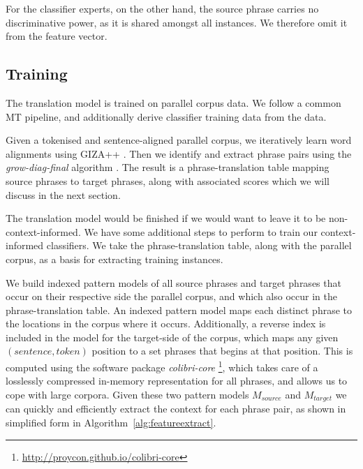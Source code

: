 \documentclass[smallextended]{svjour3}       %
\theoremstyle{break}
\begin{document}
For the classifier experts, on the other hand, the source
phrase carries no discriminative power, as it is shared amongst all instances. We
therefore omit it from the feature vector.

\subsection{Training}

The translation model is trained on parallel corpus data. We follow a common
MT pipeline, and additionally derive classifier training data from the data.

Given a tokenised and sentence-aligned parallel corpus, we iteratively learn
word alignments using GIZA++ \citep{GIZA}. Then we identify and extract phrase
pairs using the {\em grow-diag-final}\/ algorithm \citep{OchNey2003}. The
result is a phrase-translation table mapping source phrases to target
phrases, along with associated scores which we will discuss in the next
section. %

The translation model would be finished if we would want to leave it to be
non-context-informed. We have some additional steps to perform to train our
context-informed classifiers. We take the phrase-translation table, along with
the parallel corpus, as a basis for extracting training instances.

We build indexed pattern models of all source phrases and target
phrases that occur on their respective side the parallel corpus, and
which also occur in the phrase-translation table. An indexed pattern
model maps each distinct phrase to the locations in the corpus where
it occurs.  Additionally, a reverse index is included in the model for
the target-side of the corpus, which maps any given
$(sentence, token)$ position to a set phrases that begins at that
position.  This is computed using the software package
\emph{colibri-core} \footnote{\url{http://proycon.github.io/colibri-core}},
which takes care of a losslessly compressed in-memory representation
for all phrases, and allows us to cope with large corpora. Given these
two pattern models $M_{source}$ and $M_{target}$ we can quickly and
efficiently extract the context for each phrase pair, as shown in
simplified form in Algorithm~\ref{alg:featureextract}.
\end{document}
